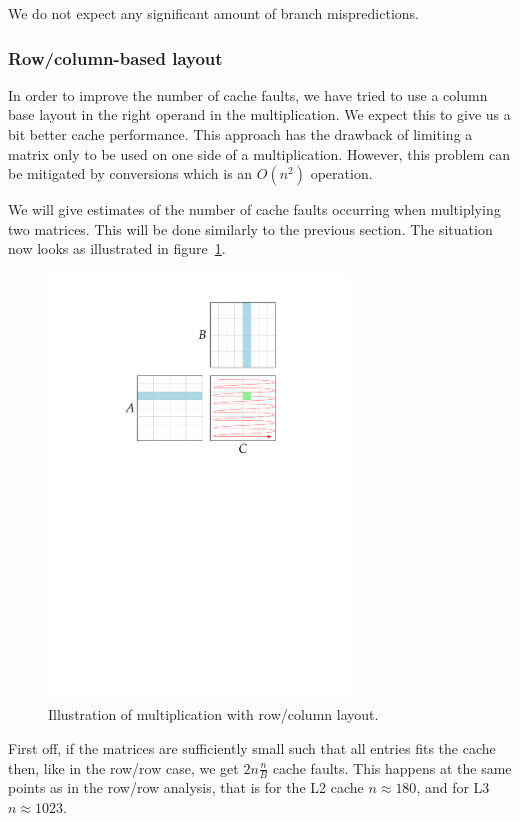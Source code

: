 We do not expect any significant amount of branch mispredictions.

\subsubsection{Row/column-based layout}
In order to improve the number of cache faults, we have tried to use a
column base layout in the right operand in the multiplication. We
expect this to give us a bit better cache performance. This approach
has the drawback of limiting a matrix only to be used on one side of a
multiplication. However, this problem can be mitigated by conversions
which is an $O(n^2)$ operation.

We will give estimates of the number of cache faults occurring when
multiplying two matrices. This will be done similarly to the previous
section. The situation now looks as illustrated in
figure~\ref{fig:colowmul}.
\begin{figure}[h!]
  \centering
  \includegraphics[width=8cm]{images/rowcolmul}
  \caption{Illustration of multiplication with row/column layout.}
  \label{fig:colowmul}
\end{figure}

First off, if the matrices are sufficiently small such that all entries
fits the cache then, like in the row/row case, we get $2n\frac{n}{B}$
cache faults. This happens at the same points as in the row/row
analysis, that is for the L2 cache $n \approx 180$, and for L3 $n
\approx 1023$.

